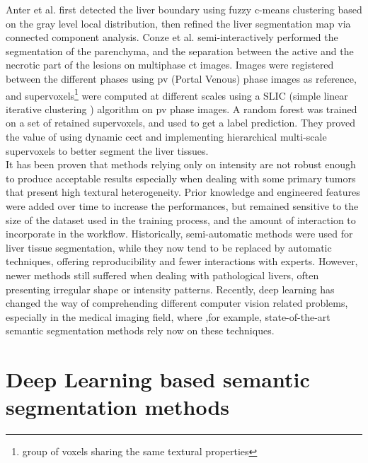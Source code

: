 Anter et al. \cite{Anter2014} first detected the liver boundary using fuzzy c-means
clustering based on the gray level local distribution, then refined the
liver segmentation map via connected component analysis. Conze et al. \cite{Conze2017} semi-interactively performed 
the segmentation of the parenchyma, and the separation between 
the active and the necrotic part of the lesions on multiphase \ac{ct} images.
Images were registered between the different phases using \ac{pv} (Portal Venous) phase images as reference, and
supervoxels\footnote{group of voxels sharing the same textural properties}
were computed at different scales using a SLIC (simple linear iterative clustering ) 
algorithm on \ac{pv} phase images. A random forest was trained 
on a set of retained supervoxels, and used to get a label prediction. 
They proved the value of using dynamic \ac{cect} and implementing 
hierarchical multi-scale supervoxels to better segment the liver tissues.\\
It has been proven that methods relying only on intensity are not robust
enough to produce acceptable results especially when dealing with some
primary tumors that present high textural heterogeneity. Prior knowledge
and engineered features were added over time to increase the
performances, but remained sensitive to the size of the dataset used in
the training process, and the amount of interaction to incorporate in
the workflow.
Historically, semi-automatic methods were used for liver tissue
segmentation, while they now tend to be replaced by automatic
techniques, offering reproducibility and fewer interactions with
experts. However, newer methods still suffered when dealing with
pathological livers, often presenting irregular shape or intensity
patterns.
Recently, deep learning has changed the way of comprehending different
computer vision related problems, especially in the medical imaging
field, where ,for example, state-of-the-art semantic segmentation 
methods rely now on these techniques.


\section{Deep Learning based semantic segmentation methods}
\label{section:StateOfTheArtDlImplementations}


